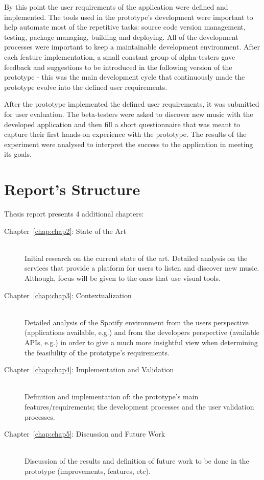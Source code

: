   By this point the user requirements of the application were defined and implemented.
  The tools used in the prototype's development were important to help automate most of the repetitive tasks: source code version management, testing, package managing, building and deploying.
  All of the development processes were important to keep a maintainable development environment.
  After each feature implementation, a small constant group of alpha-testers gave feedback and suggestions to be introduced in the following version of the prototype - this was the main development cycle that continuously made the prototype evolve into the defined user requirements.

  After the prototype implemented the defined user requirements, it was submitted for user evaluation.
  The beta-testers were asked to discover new music with the developed application and then fill a short questionnaire that was meant to capture their first hands-on experience with the prototype.
  The results of the experiment were analysed to interpret the success to the application in meeting its goals.

\section{Report's Structure}
\label{sec:structure}
  
  Thesis report presents 4 additional chapters:

  \begin{description}
    \item[Chapter~\ref{chap:chap2}: State of the Art] \hfill \\
      Initial research on the current state of the art.
      Detailed analysis on the services that provide a platform for users to listen and discover new music.
      Although, focus will be given to the ones that use visual tools.
    \item[Chapter~\ref{chap:chap3}: Contextualization] \hfill \\
      Detailed analysis of the Spotify environment from the users perspective (applications available, e.g.) and from the developers perspective (available APIs, e.g.) in order to give a much more insightful view when determining the feasibility of the prototype's requirements.
    \item[Chapter~\ref{chap:chap4}: Implementation and Validation] \hfill \\
      Definition and implementation of: the prototype's main features/requirements; the development processes and the user validation processes.
    \item[Chapter~\ref{chap:chap5}: Discussion and Future Work] \hfill \\
      Discussion of the results and definition of future work to be done in the prototype (improvements, features, etc).
  \end{description}
